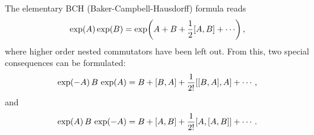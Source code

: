         The elementary BCH (Baker-Campbell-Hausdorff) formula reads
        \begin{equation}
            \exp(A) \exp(B) = \exp(A + B + \frac{1}{2} \comm{A}{B} + \cdots) \thinspace ,
        \end{equation}
        where higher order nested commutators have been left out. From this, two special consequences can be formulated:
        \begin{equation}
            \exp(-A) \thinspace B \thinspace \exp(A) = B + \comm{B}{A} + \frac{1}{2!} \comm{\comm{B}{A}}{A} + \cdots \thinspace ,
        \end{equation}
        and
        \begin{equation}
            \exp(A) \thinspace B \thinspace \exp(-A) = B + \comm{A}{B} + \frac{1}{2!} \comm{A}{\comm{A}{B}} + \cdots \thinspace .
        \end{equation}
